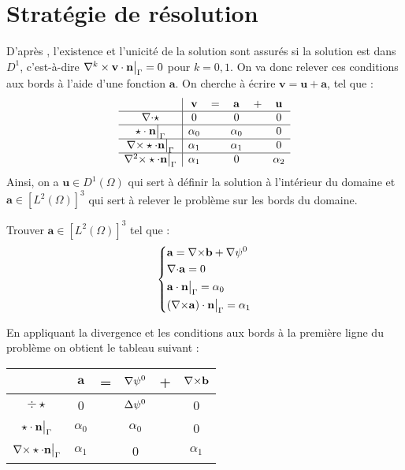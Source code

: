 \chapter{Stratégie de résolution}
\label{strat}
D'après \cite{Penel2004}, l'existence et l'unicité de la solution sont assurés si la solution est dans $D^1$, c'est-à-dire $\nabla^k\times\mathbf{v}\cdot\mathbf{n}{\big\rvert_{\Gamma}}=0$ pour $k=0,1$. On va donc relever ces conditions aux bords à l'aide d'une fonction $\mathbf{a}$. On cherche à écrire  $\mathbf{v}=\mathbf{u}+\mathbf{a}$, tel que :\\
\begin{equation}\label{v}
\begin{array}{c|ccccc}
& \mathbf{v} & = & \mathbf{a} & + & \mathbf{u}\\ \hline
{\nabla\cdot}\star & 0 & & 0 & & 0\\ \hline
\star\cdot \mathbf{n}{\big\rvert_{\Gamma}} & \alpha_0 & & \alpha_0 & & 0\\ \hline
{\nabla\times}\star\cdot \mathbf{n}{\big\rvert_{\Gamma}} & \alpha_1 & & \alpha_1 & & 0\\ \hline
{\nabla^2\times}\star\cdot \mathbf{n}{\big\rvert_{\Gamma}} & \alpha_1 & & 0 & & \alpha_2
\end{array}
\end{equation}
Ainsi, on a $\mathbf{u}\in D^1(\Omega)$ qui sert à définir la solution à l'intérieur du domaine et $\mathbf{a}\in [L^2(\Omega)]^3$ qui sert à relever le problème sur les bords du domaine.
\begin{pb}\label{a}
Trouver $\mathbf{a}\in [L^2(\Omega)]^3$ tel que :
\begin{equation*}
\left\{\begin{aligned}
&\mathbf{a}={\nabla\times} \mathbf{b}+{\nabla}\psi^0\\
&{\nabla\cdot} \mathbf{a} =0\\
&\mathbf{a}\cdot \mathbf{n}{\big\rvert_{\Gamma}} = \alpha_0\\
&({\nabla\times} \mathbf{a})\cdot \mathbf{n}{\big\rvert_{\Gamma}} = \alpha_1
\end{aligned}\right.
\end{equation*}
\end{pb}
En appliquant la divergence et les conditions aux bords à la première ligne du problème on obtient le tableau suivant :
\begin{center}
\begin{tabular}{c|ccccc}
& $\mathbf{a}$ & = & ${\nabla}\psi^0$ & + & ${\nabla\times} \mathbf{b}$ \\ \hline
$\div\star$ & 0 & & ${\Delta}\psi^0$ & & 0\\ \hline
$\star\cdot \mathbf{n}{\big\rvert_{\Gamma}}$ & $\alpha_0$ & & $\alpha_0$ & & 0\\ \hline
${\nabla\times}\star\cdot \mathbf{n}{\big\rvert_{\Gamma}}$ & $\alpha_1$ & & 0 & & $\alpha_1$
\end{tabular}
\end{center}
